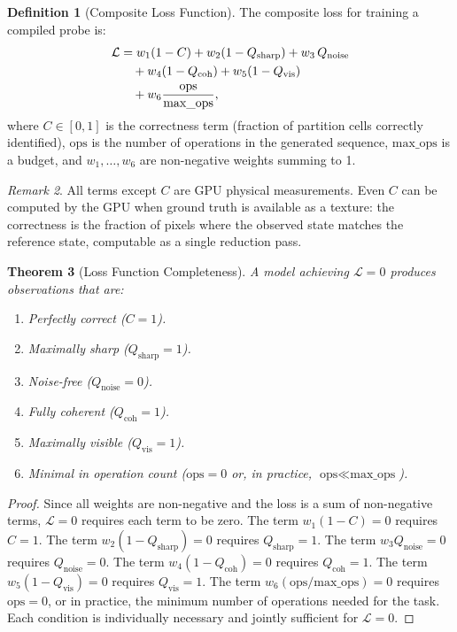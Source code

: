 \documentclass[11pt,twocolumn,a4paper]{article}
\newtheorem{theorem}{Theorem}[section]
\theoremstyle{definition}
\newtheorem{definition}[theorem]{Definition}
\theoremstyle{remark}
\newtheorem{remark}[theorem]{Remark}
\newcommand{\loss}{\mathcal{L}}
\newcommand{\Qsharp}{Q_{\mathrm{sharp}}}
\newcommand{\Qnoise}{Q_{\mathrm{noise}}}
\newcommand{\Qcoh}{Q_{\mathrm{coh}}}
\newcommand{\Qvis}{Q_{\mathrm{vis}}}
\begin{document}
\begin{definition}[Composite Loss Function]
\label{def:composite_loss}
The composite loss for training a compiled probe is:
\begin{align}
\loss &= w_1 (1 - C) + w_2 (1 - \Qsharp) + w_3 \, \Qnoise \notag \\
&\quad + w_4 (1 - \Qcoh) + w_5 (1 - \Qvis) \notag \\
&\quad + w_6 \frac{\text{ops}}{\text{max\_ops}},
\label{eq:composite_loss}
\end{align}
where $C \in [0,1]$ is the correctness term (fraction of partition cells correctly identified), $\text{ops}$ is the number of operations in the generated sequence, $\text{max\_ops}$ is a budget, and $w_1, \ldots, w_6$ are non-negative weights summing to 1.
\end{definition}

\begin{remark}
All terms except $C$ are GPU physical measurements. Even $C$ can be computed by the GPU when ground truth is available as a texture: the correctness is the fraction of pixels where the observed state matches the reference state, computable as a single reduction pass.
\end{remark}

\begin{theorem}[Loss Function Completeness]
\label{thm:loss_completeness}
A model achieving $\loss = 0$ produces observations that are:
\begin{enumerate}[nosep]
\item Perfectly correct ($C = 1$).
\item Maximally sharp ($\Qsharp = 1$).
\item Noise-free ($\Qnoise = 0$).
\item Fully coherent ($\Qcoh = 1$).
\item Maximally visible ($\Qvis = 1$).
\item Minimal in operation count ($\text{ops} = 0$ or, in practice, $\text{ops} \ll \text{max\_ops}$).
\end{enumerate}
\end{theorem}

\begin{proof}
Since all weights are non-negative and the loss is a sum of non-negative terms, $\loss = 0$ requires each term to be zero. The term $w_1(1 - C) = 0$ requires $C = 1$. The term $w_2(1 - \Qsharp) = 0$ requires $\Qsharp = 1$. The term $w_3 \Qnoise = 0$ requires $\Qnoise = 0$. The term $w_4(1 - \Qcoh) = 0$ requires $\Qcoh = 1$. The term $w_5(1 - \Qvis) = 0$ requires $\Qvis = 1$. The term $w_6 (\text{ops}/\text{max\_ops}) = 0$ requires $\text{ops} = 0$, or in practice, the minimum number of operations needed for the task. Each condition is individually necessary and jointly sufficient for $\loss = 0$.
\end{proof}
\end{document}
